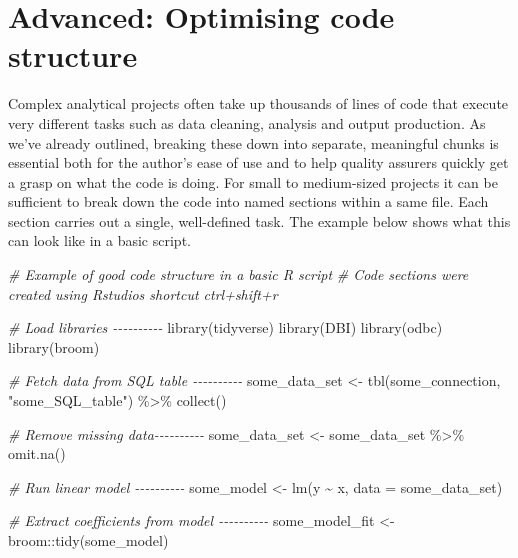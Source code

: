 \documentclass[
]{book}
\newenvironment{Shaded}{\begin{snugshade}}{\end{snugshade}}
\newcommand{\AttributeTok}[1]{\textcolor[rgb]{0.77,0.63,0.00}{#1}}
\newcommand{\CommentTok}[1]{\textcolor[rgb]{0.56,0.35,0.01}{\textit{#1}}}
\newcommand{\FunctionTok}[1]{\textcolor[rgb]{0.00,0.00,0.00}{#1}}
\newcommand{\NormalTok}[1]{#1}
\newcommand{\OtherTok}[1]{\textcolor[rgb]{0.56,0.35,0.01}{#1}}
\newcommand{\SpecialCharTok}[1]{\textcolor[rgb]{0.00,0.00,0.00}{#1}}
\newcommand{\StringTok}[1]{\textcolor[rgb]{0.31,0.60,0.02}{#1}}
\begin{document}
\hypertarget{code_structure}{%
\chapter{Advanced: Optimising code structure}\label{code_structure}}

Complex analytical projects often take up thousands of lines of code that execute very different tasks such as data cleaning, analysis and output production. As we've already outlined, breaking these down into separate, meaningful chunks is essential both for the author's ease of use and to help quality assurers quickly get a grasp on what the code is doing. For small to medium-sized projects it can be sufficient to break down the code into named sections within a same file. Each section carries out a single, well-defined task. The example below shows what this can look like in a basic script.

\begin{Shaded}
\begin{Highlighting}[]
\CommentTok{\# Example of good code structure in a basic R script}
\CommentTok{\# Code sections were created using Rstudio\textquotesingle{}s shortcut ctrl+shift+r}

\CommentTok{\# Load libraries {-}{-}{-}{-}{-}{-}{-}{-}{-}{-}}
\FunctionTok{library}\NormalTok{(tidyverse)}
\FunctionTok{library}\NormalTok{(DBI)}
\FunctionTok{library}\NormalTok{(odbc)}
\FunctionTok{library}\NormalTok{(broom)}

\CommentTok{\# Fetch data from SQL table {-}{-}{-}{-}{-}{-}{-}{-}{-}{-}}
\NormalTok{some\_data\_set }\OtherTok{\textless{}{-}} \FunctionTok{tbl}\NormalTok{(some\_connection, }\StringTok{"some\_SQL\_table"}\NormalTok{) }\SpecialCharTok{\%\textgreater{}\%}
  \FunctionTok{collect}\NormalTok{()}

\CommentTok{\# Remove missing data{-}{-}{-}{-}{-}{-}{-}{-}{-}{-}}
\NormalTok{some\_data\_set }\OtherTok{\textless{}{-}}\NormalTok{ some\_data\_set }\SpecialCharTok{\%\textgreater{}\%} 
    \FunctionTok{omit.na}\NormalTok{()}

\CommentTok{\# Run linear model {-}{-}{-}{-}{-}{-}{-}{-}{-}{-}}
\NormalTok{some\_model }\OtherTok{\textless{}{-}} \FunctionTok{lm}\NormalTok{(y }\SpecialCharTok{\textasciitilde{}}\NormalTok{ x, }\AttributeTok{data =}\NormalTok{ some\_data\_set)}

\CommentTok{\# Extract coefficients from model {-}{-}{-}{-}{-}{-}{-}{-}{-}{-}}
\NormalTok{some\_model\_fit }\OtherTok{\textless{}{-}}\NormalTok{ broom}\SpecialCharTok{::}\FunctionTok{tidy}\NormalTok{(some\_model)}
\end{Highlighting}
\end{Shaded}
\end{document}
